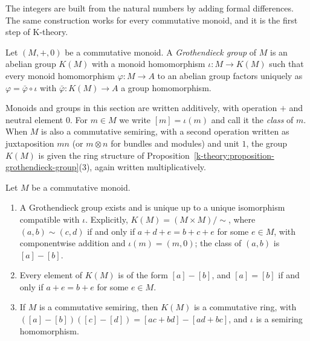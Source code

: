 The integers are built from the natural numbers by adding formal differences. The same construction works for every commutative monoid, and it is the first step of K-theory.

\begin{definition}\label{k-theory:definition-grothendieck-group}
Let $(M, +, 0)$ be a commutative monoid. A \emph{Grothendieck group} of $M$ is an abelian group $K(M)$ with a monoid homomorphism $\iota \colon M \to K(M)$ such that every monoid homomorphism
$\varphi \colon M \to A$ to an abelian group factors uniquely as $\varphi = \bar{\varphi} \circ \iota$ with $\bar{\varphi} \colon K(M) \to A$ a group homomorphism.
\end{definition}

\begin{notation}\label{k-theory:notation-grothendieck-group}
Monoids and groups in this section are written additively, with operation $+$ and neutral element $0$. For $m \in M$ we write $[m] = \iota(m)$ and call it the \emph{class} of $m$. When $M$ is also a
commutative semiring, with a second operation written as juxtaposition $mn$ (or $m \otimes n$ for bundles and modules) and unit $1$, the group $K(M)$ is given the ring structure of
Proposition~\ref{k-theory:proposition-grothendieck-group}(3), again written multiplicatively.
\end{notation}

\begin{proposition}\label{k-theory:proposition-grothendieck-group}
Let $M$ be a commutative monoid.
\begin{enumerate}
\item A Grothendieck group exists and is unique up to a unique isomorphism compatible with $\iota$. Explicitly, $K(M) = (M \times M)/{\sim}$, where $(a, b) \sim (c, d)$ if and only if
$a + d + e = b + c + e$ for some $e \in M$, with componentwise addition and $\iota(m) = (m, 0)$; the class of $(a, b)$ is $[a] - [b]$.
\item Every element of $K(M)$ is of the form $[a] - [b]$, and $[a] = [b]$ if and only if $a + e = b + e$ for some $e \in M$.
\item If $M$ is a commutative semiring, then $K(M)$ is a commutative ring, with $([a] - [b])([c] - [d]) = [ac + bd] - [ad + bc]$, and $\iota$ is a semiring homomorphism.
\end{enumerate}
\end{proposition}

